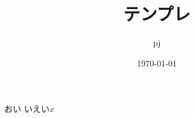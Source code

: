 \documentclass[11pt,a4paper,dvipdfmx]{jsarticle}
\title{テンプレ}
\author{pj}
\date{\today}
\begin{document}
\maketitle
おい
いえい$x$
\end{document}
